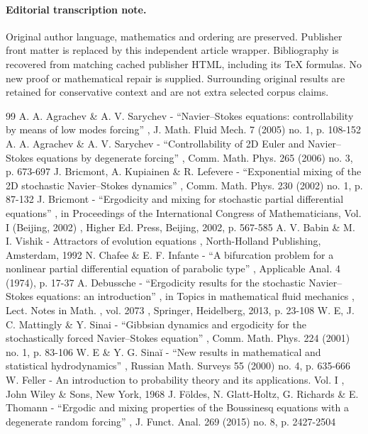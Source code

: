 \documentclass[11pt]{article}
\theoremstyle{plain}
\theoremstyle{definition}
\begin{document}
\paragraph{Editorial transcription note.}
Original author language, mathematics and ordering are preserved. Publisher front matter is replaced by this independent article wrapper. Bibliography is recovered from matching cached publisher HTML, including its TeX formulas. No new proof or mathematical repair is supplied. Surrounding original results are retained for conservative context and are not extra selected corpus claims.
\clearpage

\begin{thebibliography}{99}
 A. A. Agrachev \& A. V. Sarychev - “Navier–Stokes equations: controllability by means of low modes forcing” , J. Math. Fluid Mech. 7 (2005) no. 1, p. 108-152
 A. A. Agrachev \& A. V. Sarychev - “Controllability of 2D Euler and Navier–Stokes equations by degenerate forcing” , Comm. Math. Phys. 265 (2006) no. 3, p. 673-697
 J. Bricmont, A. Kupiainen \& R. Lefevere - “Exponential mixing of the 2D stochastic Navier–Stokes dynamics” , Comm. Math. Phys. 230 (2002) no. 1, p. 87-132
 J. Bricmont - “Ergodicity and mixing for stochastic partial differential equations” , in Proceedings of the International Congress of Mathematicians, Vol. I (Beijing, 2002) , Higher Ed. Press, Beijing, 2002, p. 567-585
 A. V. Babin \& M. I. Vishik - Attractors of evolution equations , North-Holland Publishing, Amsterdam, 1992
 N. Chafee \& E. F. Infante - “A bifurcation problem for a nonlinear partial differential equation of parabolic type” , Applicable Anal. 4 (1974), p. 17-37
 A. Debussche - “Ergodicity results for the stochastic Navier–Stokes equations: an introduction” , in Topics in mathematical fluid mechanics , Lect. Notes in Math. , vol. 2073 , Springer, Heidelberg, 2013, p. 23-108
 W. E, J. C. Mattingly \& Y. Sinai - “Gibbsian dynamics and ergodicity for the stochastically forced Navier–Stokes equation” , Comm. Math. Phys. 224 (2001) no. 1, p. 83-106
 W. E \& Y. G. Sinaĭ - “New results in mathematical and statistical hydrodynamics” , Russian Math. Surveys 55 (2000) no. 4, p. 635-666
 W. Feller - An introduction to probability theory and its applications. Vol. I , John Wiley \& Sons, New York, 1968
 J. Földes, N. Glatt-Holtz, G. Richards \& E. Thomann - “Ergodic and mixing properties of the Boussinesq equations with a degenerate random forcing” , J. Funct. Anal. 269 (2015) no. 8, p. 2427-2504

\end{thebibliography}
\end{document}
